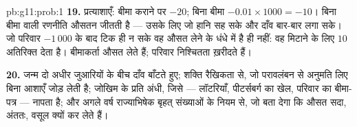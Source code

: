 \begin{solution}{pb:g11:prob:1}
\textbf{19.} प्रत्याशाएँ: बीमा कराने पर $-20$; बिना बीमा $-0.01 \times 1000 = -10$। बिना बीमा
वाली रणनीति औसतन जीतती है --- उसके लिए जो हानि सह सके और दाँव बार-बार लगा
सके। जो परिवार $-1\,000$ के बाद टिक ही न सके वह औसत लेने के धंधे में है ही नहीं:
वह  मिटाने के लिए $10$ अतिरिक्त देता है। बीमाकर्ता औसत लेते हैं;
परिवार निश्चितता ख़रीदते हैं।

\textbf{20.} जन्म दो अधीर जुआरियों के बीच दाँव बाँटते हुए; शक्ति रैखिकता से,
जो परावलंबन से अनुमति लिए बिना आशाएँ जोड़ लेती है; जोखिम के प्रति अंधी, जिसे
 --- लॉटरियाँ, पीटर्सबर्ग का खेल, परिवार का बीमा-पत्र --- नापता है;
और अगले वर्ष राज्याभिषेक बृहत् संख्याओं के नियम से, जो बता देगा कि औसत सदा,
अंततः, वसूल क्यों कर लेते हैं।
\end{solution}
